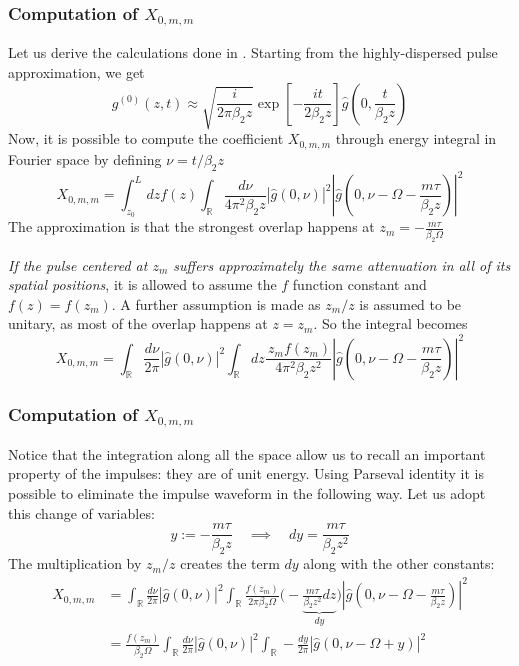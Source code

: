 \documentclass[8pt]{beamer} %
\begin{document}
\begin{frame}
    \frametitle{Computation of $X_{0, m, m}$}
    Let us derive the calculations done in \cite[eq. 11, 12]{Dar_2013}. Starting from the highly-dispersed pulse approximation, we get
    \begin{equation}
        g^{(0)}(z, t) \approx \sqrt{\frac{i}{2\pi \beta_2 z}} \exp\left[-\frac{it}{2 \beta_2 z}\right] \hat{g}\left(0, \frac{t}{\beta_2 z}\right)
    \end{equation}
    Now, it is possible to compute the coefficient $X_{0, m, m}$ through energy integral in Fourier space by defining $\nu = t/\beta_2 z$
    \begin{equation}
        X_{0, m, m} = \int_{z_0}^{L} dz f(z) \int_{\mathbb{R}} \frac{d\nu}{4\pi^2 \beta_2 z} |\hat{g}(0, \nu)|^2 \left|\hat{g}\left(0, \nu-\Omega-\frac{m\tau}{\beta_2 z}\right)\right|^2
    \end{equation}
    The approximation is that the strongest overlap happens at $z_m = -\frac{m\tau}{\beta_2 \Omega}$

    \textit{If the pulse centered at $z_m$ suffers approximately the same attenuation in all of its spatial positions}, it is allowed to assume the $f$ function constant and $f(z) = f(z_m)$. A further assumption is made as $z_m/z$ is assumed to be unitary, as most of the overlap happens at $z=z_m$. So the integral becomes
    \begin{equation}
        X_{0, m, m} = \int_{\mathbb{R}} \frac{d\nu}{2\pi}  |\hat{g}(0, \nu)|^2 \int_{\mathbb{R}} dz\frac{\, z_m f(z_m)}{4\pi^2 \beta_2 z^2}\left|\hat{g}\left(0, \nu-\Omega-\frac{m\tau}{\beta_2 z}\right)\right|^2
    \end{equation}
\end{frame}


\begin{frame}
    \frametitle{Computation of $X_{0, m, m}$}
    Notice that the integration along all the space allow us to recall an important property of the impulses: they are of unit energy. Using Parseval identity it is possible to eliminate the impulse waveform in the following way.
    Let us adopt this change of variables:
    \begin{equation}
        y:= -\frac{m\tau}{\beta_2 z} \quad \implies \quad dy = \frac{m\tau}{\beta_2 z^2}
    \end{equation}
    The multiplication by $z_m/z$ creates the term $dy$ along with the other constants:
    \begin{align}
        X_{0, m, m} & = \int_{\mathbb{R}} \frac{d\nu}{2\pi}  |\hat{g}(0, \nu)|^2 \int_{\mathbb{R}} \frac{f(z_m)}{2\pi \beta_2 \Omega}  \Big(-\underbrace{\frac{m\tau}{\beta_2 z^2} dz}_{dy}\Big) \left|\hat{g}\left(0, \nu-\Omega-\frac{m\tau}{\beta_2 z}\right)\right|^2 \\
                    & =  \frac{f(z_m)}{ \beta_2 \Omega}\int_{\mathbb{R}} \frac{d\nu}{2\pi}  |\hat{g}(0, \nu)|^2 \int_{\mathbb{R}} - \frac{dy}{2\pi} \left|\hat{g}\left(0, \nu-\Omega + y \right)\right|^2
    \end{align}
\end{frame}
\end{document}
